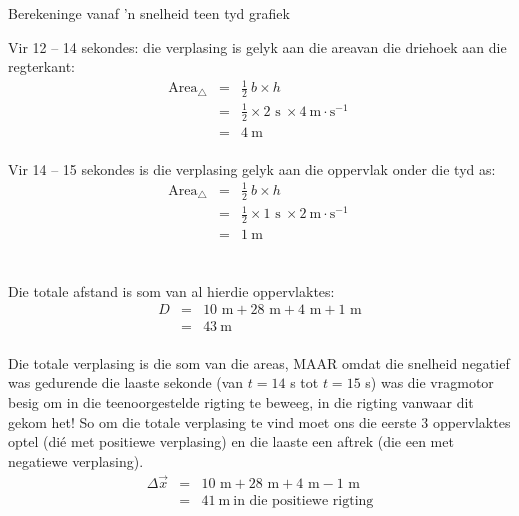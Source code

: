 \begin{wex}{Berekeninge vanaf  'n snelheid teen tyd grafiek}
{\begin{minipage}{0.4\textwidth}
Vir 12 -- 14 sekondes: die verplasing is gelyk aan die areavan die driehoek aan die regterkant:
\begin{eqnarray*}
\text{Area}_{\triangle} &=& \frac{1}{2}~b \times h\\
&=& \frac{1}{2} \times 2\text{~s}\ \times 4 ~\text{m}\cdot \text{s}^{-1} \ \\
&=&4\ \text{m}\\
\end{eqnarray*}
\end{minipage}
\begin{minipage}{0.05\textwidth}
\begin{center}
\end{center}
\end{minipage}
\begin{minipage}{0.4\textwidth}
Vir 14 -- 15 sekondes is die verplasing gelyk aan die oppervlak onder die tyd as:
\begin{eqnarray*}
\text{Area}_{\triangle} &=& \frac{1}{2}~b \times h\\
&=& \frac{1}{2} \times 1\text{~s}\ \times 2 ~\text{m}\cdot \text{s}^{-1}\ \\
&=&1\ \text{m}\\
\end{eqnarray*}
\end{minipage}
\\
Die totale afstand is som van al hierdie oppervlaktes:
\begin{eqnarray*}
D&=&10\text{~m} + 28\text{~m} + 4\text{~m} + 1\text{~m}\\
&=&43\ \text{m}
\end{eqnarray*}
\\
Die totale verplasing is die som van die areas, MAAR omdat die snelheid negatief was gedurende die laaste sekonde (van $t=14$ s tot $t=15$ s) was die vragmotor besig om in die teenoorgestelde rigting te beweeg, in die rigting vanwaar dit gekom het! So om die totale verplasing te vind moet ons die eerste 3 oppervlaktes optel (di\'e met positiewe verplasing) en die laaste een aftrek (die een met negatiewe verplasing).
\begin{eqnarray*}
\Delta \vec{x}&=&10\text{~m} +28\text{~m} +4\text{~m} -1\text{~m}\\
&=&41\ \text{m}\ \mbox{in die positiewe rigting}
\end{eqnarray*}
}
\end{wex}

